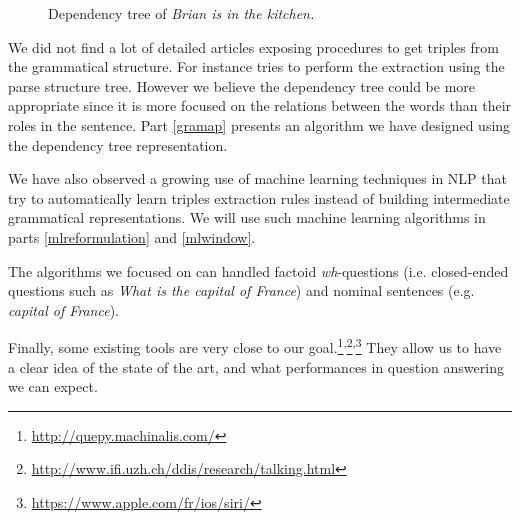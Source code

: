 \begin{figure}
\centering
{}
  \caption{Dependency tree of \emph{Brian is in the kitchen.}}
  \label{dtree}
\end{figure}

We did not find a lot of detailed articles exposing procedures to get triples from the grammatical structure. For instance \cite{parsetree} tries to perform the extraction using the parse structure tree. However we believe the dependency tree could be more appropriate since it is more focused on the relations between the words than their roles in the sentence. Part \ref{gramap} presents an algorithm we have designed using the dependency tree representation.

We have also observed a growing use of machine learning techniques in NLP that try to automatically learn triples extraction rules instead of building intermediate grammatical representations. We will use such machine learning algorithms in parts \ref{mlreformulation} and \ref{mlwindow}.

The algorithms we focused on can handled factoid \textit{wh}-questions (i.e. closed-ended questions such as \textit{What is the capital of France}) and nominal sentences (e.g. \textit{capital of France}). 

Finally, some existing tools are very close to our goal.\footnote{\url{http://quepy.machinalis.com/}}\textsuperscript{,}\footnote{\url{http://www.ifi.uzh.ch/ddis/research/talking.html}}\textsuperscript{,}\footnote{\url{https://www.apple.com/fr/ios/siri/}} They allow us to have a clear idea of the state of the art, and what performances in question answering we can expect.